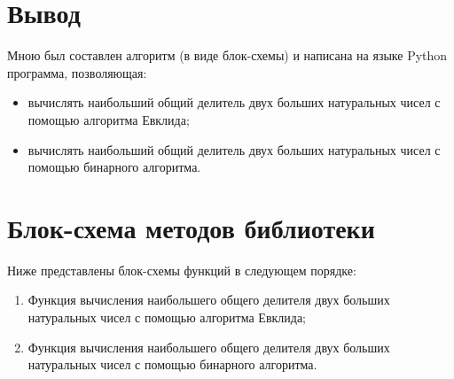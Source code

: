 \clearpage
\section{Вывод}
Мною был составлен алгоритм (в виде блок-схемы) и написана на языке Python программа, позволяющая:
\begin{itemize}
    \item вычислять наибольший общий делитель двух больших натуральных чисел с помощью алгоритма Евклида;
    \item вычислять наибольший общий делитель двух больших натуральных чисел с помощью бинарного алгоритма.
\end{itemize}

\clearpage
\section{Блок-схема методов библиотеки}
Ниже представлены блок-схемы функций в следующем порядке:
\begin{enumerate}
    \item Функция вычисления наибольшего общего делителя двух больших натуральных чисел с помощью алгоритма Евклида;
    \item Функция вычисления наибольшего общего делителя двух больших натуральных чисел с помощью бинарного алгоритма.
\end{enumerate}

